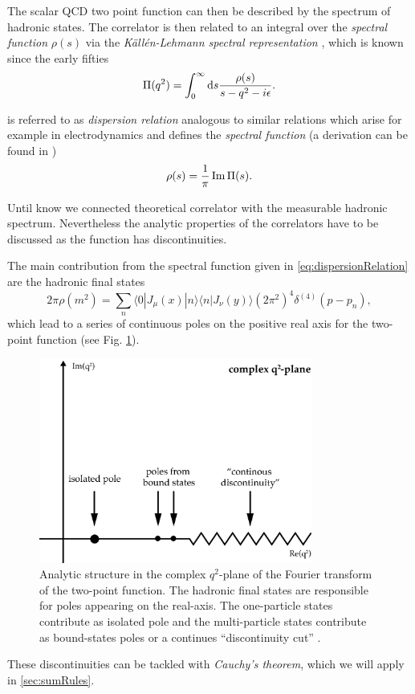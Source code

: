 \documentclass[../../index.tex]{subfiles}
\begin{document}
The scalar QCD two point function can then be described by the spectrum of
hadronic states. The correlator is then related to an integral over the
\textit{spectral function} $\rho(s)$ via the \textit{Källén-Lehmann spectral
  representation} \cite{Kallen1952,Lehmann1954}, which is known since the early
fifties
\begin{equation}
  \label{eq:dispersionRelation}
  \Pi(q^2) = \int_0^\infty \dif s \frac{\rho(s)}{s - q^2 - i \epsilon}.
\end{equation}

 is referred to as \textit{dispersion relation}
analogous to similar relations which arise for example in electrodynamics and
defines the \textit{spectral function} (a derivation can be found in
\cite{Rafael1997})
\begin{equation}
  \label{eq:spectralFunction}
  \rho(s) = \frac{1}{\pi} \operatorname{Im} \Pi(s).
\end{equation}

Until know we connected theoretical correlator with the measurable hadronic
spectrum. Nevertheless the analytic properties of the correlators have to be
discussed as the function has discontinuities.

The main contribution from the spectral function given in
\cref{eq:dispersionRelation} are the hadronic final states
\begin{equation}
  2 \pi \rho(m^2) = \sum_n \langle  0 | J_\mu(x) | n \rangle \langle n | J_\nu(y) \rangle (2 \pi^2)^4 \delta^{(4)}(p - p_n),
\end{equation}
which lead to a series of continuous poles on the positive real axis for the
two-point function (see Fig. \ref{fig:analyticStructureCorrelator}).
\begin{figure}
  \centering
  \includegraphics[width=0.8\textwidth]{./images/analyticStructureCorrelator.eps}
  \caption{Analytic structure in the complex $q^2$-plane of the Fourier
    transform of the two-point function. The hadronic final states are
    responsible for poles appearing on the real-axis. The one-particle states
    contribute as isolated pole and the multi-particle states contribute as
    bound-states poles or a continues ``discontinuity cut'' \cite{Peskin1995}.}
  \label{fig:analyticStructureCorrelator}
\end{figure}
These discontinuities can be tackled with \textit{Cauchy's theorem}, which we
will apply in \cref{sec:sumRules}.
\end{document}
